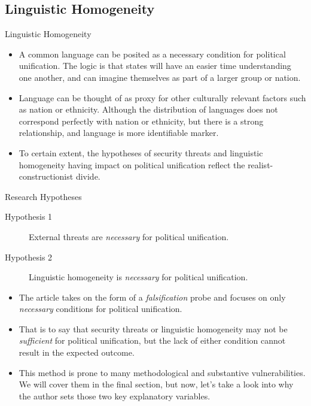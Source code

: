 \documentclass{beamer}
\begin{document}
	\subsection{Linguistic Homogeneity}
	\begin{frame}{Linguistic Homogeneity}
		\begin{itemize}
			\item A common language can be posited as a necessary condition for political unification. The logic is that states will have an easier time understanding one another, and can imagine themselves as part of a larger group or nation.
			\item Language can be thought of as proxy for other culturally relevant factors such as nation or ethnicity. Although the distribution of languages does not correspond perfectly with nation or ethnicity, but there is a strong relationship, and language is more identifiable marker.
			\item To certain extent, the hypotheses of security threats and linguistic homogeneity having impact on political unification reflect the realist-constructionist divide.
		\end{itemize}
	\end{frame}


	\begin{frame}{Research Hypotheses}
		\begin{description}
			\item[Hypothesis 1] External threats are \textit{necessary} for political unification.
			\item[Hypothesis 2] Linguistic homogeneity is \textit{necessary} for political unification.
		\end{description}
		\begin{itemize}
			\item The article takes on the form of a \textit{falsification} probe and focuses on only \textit{necessary} conditions for political unification.
			\item That is to say that security threats or linguistic homogeneity may not be \textit{sufficient} for political unification, but the lack of either condition cannot result in the expected outcome.
			\item This method is prone to many methodological and substantive vulnerabilities. We will cover them in the final section, but now, let's take a look into why the author sets those two key explanatory variables.
		\end{itemize}
	\end{frame}
\end{document}
